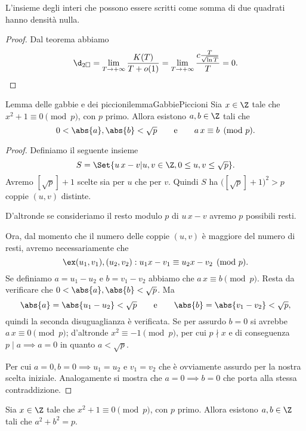 \begin{cor}
	L'insieme degli interi che possono essere scritti come somma di due quadrati hanno densità nulla.
\end{cor}

\begin{proof}
	Dal teorema abbiamo
	\[
		\d_{2\square} = \lim_{T \to +\infty} \frac{K(T)}{T+o(1)} = \lim_{T \to +\infty} \frac{c \frac{T}{\sqrt{\ln T}}}{T} = 0.
	\]
\end{proof}

\begin{teor}{Lemma delle gabbie e dei piccioni}{lemmaGabbiePiccioni}
	Sia \(x\in \Z\) tale che \(x^2+1 \equiv 0 \pmod{p}\), con \(p\) primo.
	Allora esistono \(a,b\in \Z\) tali che
	\[
		0 < \abs{a},\abs{b} < \sqrt{p} \qquad\text{e}\qquad a\,x \equiv b \pmod{p}.
	\]
\end{teor}

\begin{proof}
	Definiamo il seguente insieme
	\[
		S = \Set{u\,x - v | u,v\in \Z, 0\le u,v \le \sqrt{p}}.
	\]
	Avremo \([\sqrt{p}]+1\) scelte sia per \(u\) che per \(v\).
	Quindi \(S\) ha \(\big([\sqrt{p}]+1\big)^2>p\) coppie \((u,v)\) distinte.

	D'altronde se consideriamo il resto modulo \(p\) di \(u\,x-v\) avremo \(p\) possibili resti.

	Ora, dal momento che il numero delle coppie \((u,v)\) è maggiore del numero di resti, avremo necessariamente che
	\[
		\ex (u_1,v_1),(u_2,v_2) : u_1 x - v_1 \equiv u_2 x  - v_2 \pmod{p}.
	\]
	Se definiamo \(a=u_1-u_2\) e \(b=v_1-v_2\) abbiamo che \(a\,x \equiv b \pmod{p}\).
	Resta da verificare che \(0 < \abs{a},\abs{b} < \sqrt{p}\).
	Ma
	\[
		\abs{a} = \abs{u_1-u_2} < \sqrt{p} \qquad\text{e}\qquad \abs{b} = \abs{v_1-v_2} < \sqrt{p},
	\]
	quindi la seconda disuguaglianza è verificata.
	Se per assurdo \(b=0\) si avrebbe \(a\,x \equiv 0 \pmod{p}\); d'altronde \(x^2 \equiv -1 \pmod{p}\), per cui \(p \nmid x\) e di conseguenza \(p \mid a \implies a=0\) in quanto \(a < \sqrt{p}\).

	Per cui \(a=0, b=0 \implies u_1=u_2\) e \(v_1=v_2\) che è ovviamente assurdo per la nostra scelta iniziale.
	Analogamente si mostra che \(a=0 \implies b=0\) che porta alla stessa contraddizione.
\end{proof}

\begin{cor}
	Sia \(x\in \Z\) tale che \(x^2+1 \equiv 0 \pmod{p}\), con \(p\) primo.
	Allora esistono \(a,b\in \Z\) tali che \(a^2+b^2 =p\).
\end{cor}

